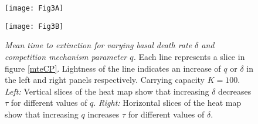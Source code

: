 \iffalse
\begin{figure}[h]
	\centering
	\subfloat[\emph{Varying $\delta$}]{\texttt{[image: Figure3-A]}\label{mte:delta}}
	\hfill
	\subfloat[\emph{Varying $q$} ]{\texttt{[image: Figure3-B]}\label{mte:q}}
	\caption{\emph{Mean time to extinction for varying $\delta$ and $q$.} Each line represents a slice in Figure \ref{mteCP}: Figure \ref{mte:delta} are vertical slices which show how, for different values of $q$, the $\delta$ affects $\tau$. Similarly Figure \ref{mte:q} are horizontal slices which show how, for different values of $\delta$, the $q$ affects $\tau$. As in Figure \ref{qsd}, lightness of the line indicates an increase of \ref{mte:delta} $q$ and \ref{mte:q} $\delta$}
	\label{mte}
\end{figure}
\fi
\begin{figure}[h]
	\centering
	\begin{minipage}{0.49\linewidth}
		\centering
		\texttt{[image: Fig3A]}
	\end{minipage}
	\begin{minipage}{0.49\linewidth}
		\centering
		\texttt{[image: Fig3B]}
	\end{minipage}
	\caption{\emph{Mean time to extinction for varying basal death rate $\delta$ and competition mechanism parameter $q$.} Each line represents a slice in figure \ref{mteCP}. Lightness of the line indicates an increase of $q$ or $\delta$ in the left and right panels respectively. Carrying capacity $K=100$. 
	\emph{Left:} Vertical slices of the heat map show that increasing $\delta$ decreases $\tau$ for different values of $q$. 
	\emph{Right:} Horizontal slices of the heat map show that increasing $q$ increases $\tau$ for different values of $\delta$. 
	}
	\label{mte}
\end{figure}

